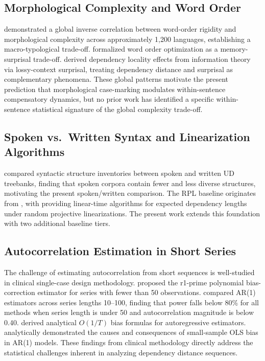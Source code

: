 \documentclass[11pt,letterpaper]{article}
\begin{document}
\subsection{Morphological Complexity and Word Order}

\citet{Bentz2017} demonstrated a global inverse correlation between word-order rigidity and morphological complexity across approximately 1,200 languages, establishing a macro-typological trade-off. \citet{Hahn2021} formalized word order optimization as a memory-surprisal trade-off. \citet{Futrell2020b} derived dependency locality effects from information theory via lossy-context surprisal, treating dependency distance and surprisal as complementary phenomena. These global patterns motivate the present prediction that morphological case-marking modulates within-sentence compensatory dynamics, but no prior work has identified a specific within-sentence statistical signature of the global complexity trade-off.

\subsection{Spoken vs.\ Written Syntax and Linearization Algorithms}

\citet{Dobrovoljc2025} compared syntactic structure inventories between spoken and written UD treebanks, finding that spoken corpora contain fewer and less diverse structures, motivating the present spoken/written comparison. The RPL baseline originates from \citet{Gildea2007, Gildea2010}, with \citet{AlemanyPuig2022} providing linear-time algorithms for expected dependency lengths under random projective linearizations. The present work extends this foundation with two additional baseline tiers.

\subsection{Autocorrelation Estimation in Short Series}

The challenge of estimating autocorrelation from short sequences is well-studied in clinical single-case design methodology. \citet{Arnau2001} proposed the r1-prime polynomial bias-correction estimator for series with fewer than 50 observations. \citet{Krone2017} compared AR(1) estimators across series lengths 10--100, finding that power falls below 80\% for all methods when series length is under 50 and autocorrelation magnitude is below 0.40. \citet{Shaman1988} derived analytical $O(1/T)$ bias formulas for autoregressive estimators. \citet{Dou2026} analytically demonstrated the causes and consequences of small-sample OLS bias in AR(1) models. These findings from clinical methodology directly address the statistical challenges inherent in analyzing dependency distance sequences.
\end{document}
